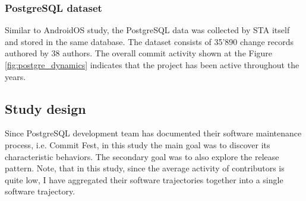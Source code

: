 \subsubsection{PostgreSQL dataset}
Similar to AndroidOS study, the PostgreSQL data was collected by STA itself and stored in the same database. The dataset consists of 35'890 change records authored by 38 authors. The overall commit activity shown at the Figure \ref{fig:postgre_dynamics} indicates that the project has been active throughout the years.

\subsection{Study design}
Since PostgreSQL development team has documented their software maintenance process, i.e. Commit Fest, in this study the main goal was to discover its characteristic behaviors. The secondary goal was to also explore the release pattern. Note, that in this study, since the average activity of contributors is quite low, I have aggregated their software trajectories together into a single software trajectory.

